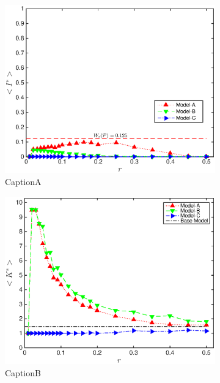 \documentclass[10pt,journal,compsoc]{IEEEtran}
\theoremstyle{plain}
\theoremstyle{definition}
\theoremstyle{remark}
\begin{document}
\begin{figure}[!tbp]
	\begin{subfigure}{\columnwidth}%
		\includegraphics[width=\columnwidth]
			{Fig-FigureA}
		\caption{CaptionA} 
		\label{fig:figureA}
	\end{subfigure}
	\begin{subfigure}{\columnwidth}%
		\includegraphics[width=\columnwidth]
			{Fig-FigureB}
		\caption{CaptionB} 
		\label{fig:figureB}
	\end{subfigure}\\
	\begin{subfigure}{\columnwidth}%

\end{subfigure}
\end{figure}
\end{document}
